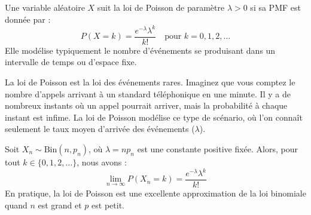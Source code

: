 \begin{definitionbox}
Une variable aléatoire $X$ suit la loi de Poisson de paramètre $\lambda > 0$ si sa PMF est donnée par :
$$ P(X=k) = \frac{e^{-\lambda} \lambda^k}{k!} \quad \text{pour } k=0, 1, 2, \dots $$
Elle modélise typiquement le nombre d'événements se produisant dans un intervalle de temps ou d'espace fixe.
\end{definitionbox}

\begin{intuitionbox}
La loi de Poisson est la loi des événements rares. Imaginez que vous comptez le nombre d'appels arrivant à un standard téléphonique en une minute. Il y a de nombreux instants où un appel pourrait arriver, mais la probabilité à chaque instant est infime. La loi de Poisson modélise ce type de scénario, où l'on connaît seulement le taux moyen d'arrivée des événements ($\lambda$).
\end{intuitionbox}

\begin{theorembox}
Soit $X_n \sim \text{Bin}(n, p_n)$, où $\lambda = np_n$ est une constante positive fixée. Alors, pour tout $k \in \{0, 1, 2, \dots\}$, nous avons :
$$ \lim_{n \to \infty} P(X_n=k) = \frac{e^{-\lambda}\lambda^k}{k!} $$
En pratique, la loi de Poisson est une excellente approximation de la loi binomiale quand $n$ est grand et $p$ est petit.
\end{theorembox}


